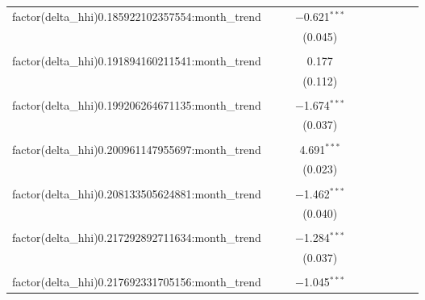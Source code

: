 \begin{table}[H]
{\begin{tabular}{@{\extracolsep{5pt}}lccccccccc}
  factor(delta\_hhi)0.185922102357554:month\_trend &  &  & $-$0.621$^{***}$ &  &  &  &  &  &  \\  

   &  &  & (0.045) &  &  &  &  &  &  \\  

   & & & & & & & & & \\  

  factor(delta\_hhi)0.191894160211541:month\_trend &  &  & 0.177 &  &  &  &  &  &  \\  

   &  &  & (0.112) &  &  &  &  &  &  \\  

   & & & & & & & & & \\  

  factor(delta\_hhi)0.199206264671135:month\_trend &  &  & $-$1.674$^{***}$ &  &  &  &  &  &  \\  

   &  &  & (0.037) &  &  &  &  &  &  \\  

   & & & & & & & & & \\  

  factor(delta\_hhi)0.200961147955697:month\_trend &  &  & 4.691$^{***}$ &  &  &  &  &  &  \\  

   &  &  & (0.023) &  &  &  &  &  &  \\  

   & & & & & & & & & \\  

  factor(delta\_hhi)0.208133505624881:month\_trend &  &  & $-$1.462$^{***}$ &  &  &  &  &  &  \\  

   &  &  & (0.040) &  &  &  &  &  &  \\  

   & & & & & & & & & \\  

  factor(delta\_hhi)0.217292892711634:month\_trend &  &  & $-$1.284$^{***}$ &  &  &  &  &  &  \\  

   &  &  & (0.037) &  &  &  &  &  &  \\  

   & & & & & & & & & \\  

  factor(delta\_hhi)0.217692331705156:month\_trend &  &  & $-$1.045$^{***}$ &  &  &  &  &  &  \\  


\end{tabular}}
\end{table}
